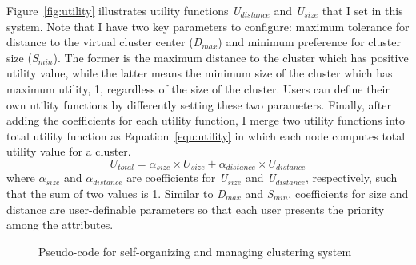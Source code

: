 %
Figure~\ref{fig:utility} illustrates utility functions \textit{U$_{distance}$} and
\textit{U$_{size}$} that I set in this system.
%
Note that I have two key parameters to configure: maximum tolerance for
distance to the virtual cluster center (\textit{D$_{max}$}) and minimum
preference for cluster size (\textit{S$_{min}$}).
%
The former is the maximum distance to the cluster which has positive
utility value, while the latter means the minimum size of the cluster
which has maximum utility, 1, regardless of the size of the cluster.
%
Users can define their own utility functions by differently setting
these two parameters.
%
Finally, after adding the coefficients for each utility function, I
merge two utility functions into total utility function as
Equation~\eqref{equ:utility} in which each node computes total utility
value for a cluster.
%
\begin{equation}
	\textit{U$_{total}$} = \textit{$\alpha$$_{size}$} \times
\textit{U$_{size}$} + \textit{$\alpha$$_{distance}$} \times
\textit{U$_{distance}$} 
\label{equ:utility}
\end{equation}
%
where \textit{$\alpha$$_{size}$} and \textit{$\alpha$$_{distance}$} are
coefficients for \textit{U$_{size}$} and \textit{U$_{distance}$},
respectively, such that the sum of two values is 1.
%
Similar to \textit{D$_{max}$} and \textit{S$_{min}$}, coefficients for
size and distance are user-definable parameters so that each user
presents the priority among the attributes.
%
\begin{figure}
\centering
{}
\caption{Pseudo-code for self-organizing and managing clustering system}
\label{fig:solare_algorithm}
\end{figure}
%

